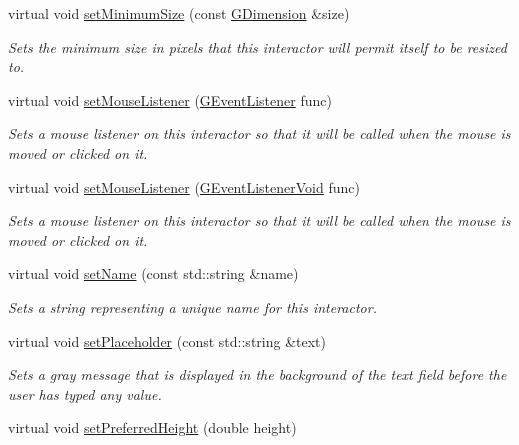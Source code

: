 \begin{DoxyCompactItemize}
virtual void \mbox{\hyperlink{classsgl_1_1GInteractor_a3b1046117ac6cb7abe467e00ba8a81f4}{set\+Minimum\+Size}} (const \mbox{\hyperlink{structsgl_1_1GDimension}{G\+Dimension}} \&size)
\begin{DoxyCompactList}\small\item\em Sets the minimum size in pixels that this interactor will permit itself to be resized to. \end{DoxyCompactList}\item 
virtual void \mbox{\hyperlink{classsgl_1_1GInteractor_a37d8dbc943f59920f705b0104f60bde2}{set\+Mouse\+Listener}} (\mbox{\hyperlink{namespacesgl_ae9f3e9eab70035da1a2b114e21357b25}{G\+Event\+Listener}} func)
\begin{DoxyCompactList}\small\item\em Sets a mouse listener on this interactor so that it will be called when the mouse is moved or clicked on it. \end{DoxyCompactList}\item 
virtual void \mbox{\hyperlink{classsgl_1_1GInteractor_aea7f647ea62d59f71b5fad6aa65eeaf9}{set\+Mouse\+Listener}} (\mbox{\hyperlink{namespacesgl_a54427ce97bb1c2804e4fe2b0a62e8b17}{G\+Event\+Listener\+Void}} func)
\begin{DoxyCompactList}\small\item\em Sets a mouse listener on this interactor so that it will be called when the mouse is moved or clicked on it. \end{DoxyCompactList}\item 
virtual void \mbox{\hyperlink{classsgl_1_1GInteractor_a9d3a2685df23b5e7cbf59c19c4a1f9b5}{set\+Name}} (const std\+::string \&name)
\begin{DoxyCompactList}\small\item\em Sets a string representing a unique name for this interactor. \end{DoxyCompactList}\item 
virtual void \mbox{\hyperlink{classsgl_1_1GTextField_aa21a9bebb4652ab6780d0c11eff47aee}{set\+Placeholder}} (const std\+::string \&text)
\begin{DoxyCompactList}\small\item\em Sets a gray message that is displayed in the background of the text field before the user has typed any value. \end{DoxyCompactList}\item 
virtual void \mbox{\hyperlink{classsgl_1_1GInteractor_a1ab987704fce32098706c6f00fb08218}{set\+Preferred\+Height}} (double height)

\end{DoxyCompactItemize}
